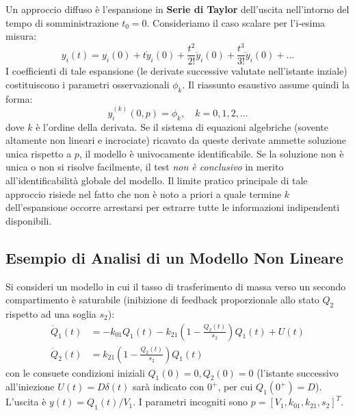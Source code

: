 Un approccio diffuso è l'espansione in \textbf{Serie di Taylor} dell'uscita nell'intorno del tempo di somministrazione $t_0 = 0$. Consideriamo il caso scalare per l'i-esima misura:
\begin{equation}
y_i(t) = y_i(0) + t \dot{y}_i(0) + \frac{t^2}{2!} \ddot{y}_i(0) + \frac{t^3}{3!} \dddot{y}_i(0) + \dots
\end{equation}
I coefficienti di tale espansione (le derivate successive valutate nell'istante inziale) costituiscono i parametri osservazionali $\phi_k$. Il riassunto esaustivo assume quindi la forma:
\begin{equation}
y_i^{(k)}(0, p) = \phi_k, \quad k = 0, 1, 2, \dots
\end{equation}
dove $k$ è l'ordine della derivata. Se il sistema di equazioni algebriche (sovente altamente non lineari e incrociate) ricavato da queste derivate ammette soluzione unica rispetto a $p$, il modello è univocamente identificabile. Se la soluzione non è unica o non si risolve facilmente, il test \textit{non è conclusivo} in merito all'identificabilità globale del modello. Il limite pratico principale di tale approccio risiede nel fatto che non è noto a priori a quale termine $k$ dell'espansione occorre arrestarsi per estrarre tutte le informazioni indipendenti disponibili.

\subsection{Esempio di Analisi di un Modello Non Lineare}
Si consideri un modello in cui il tasso di trasferimento di massa verso un secondo compartimento è saturabile (inibizione di feedback proporzionale allo stato $Q_2$ rispetto ad una soglia $s_2$):
\begin{align}
\dot{Q}_1(t) &= -k_{01}Q_1(t) - k_{21}\left(1 - \frac{Q_2(t)}{s_2}\right)Q_1(t) + U(t) \\
\dot{Q}_2(t) &= k_{21}\left(1 - \frac{Q_2(t)}{s_2}\right)Q_1(t)
\end{align}
con le consuete condizioni iniziali $Q_1(0)=0, Q_2(0)=0$ (l'istante successivo all'iniezione $U(t)=D\delta(t)$ sarà indicato con $0^+$, per cui $Q_1(0^+) = D$). L'uscita è $y(t) = Q_1(t)/V_1$.
I parametri incogniti sono $p = [V_1, k_{01}, k_{21}, s_2]^T$. 

